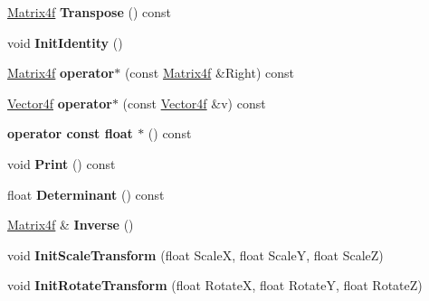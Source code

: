 \begin{DoxyCompactItemize}
\item 
\hypertarget{classMatrix4f_aaa55b11a3b44065ebaea23750d8f15f2}{\hyperlink{classMatrix4f}{Matrix4f} {\bfseries Transpose} () const }\label{classMatrix4f_aaa55b11a3b44065ebaea23750d8f15f2}

\item 
\hypertarget{classMatrix4f_a5cedfa71f928157c3ed4516edc72cb9c}{void {\bfseries Init\-Identity} ()}\label{classMatrix4f_a5cedfa71f928157c3ed4516edc72cb9c}

\item 
\hypertarget{classMatrix4f_adbda08a5bee8094658af28bfaa851e1c}{\hyperlink{classMatrix4f}{Matrix4f} {\bfseries operator$\ast$} (const \hyperlink{classMatrix4f}{Matrix4f} \&Right) const }\label{classMatrix4f_adbda08a5bee8094658af28bfaa851e1c}

\item 
\hypertarget{classMatrix4f_ae41adb262631b053ab76c68a36be4c4e}{\hyperlink{structVector4f}{Vector4f} {\bfseries operator$\ast$} (const \hyperlink{structVector4f}{Vector4f} \&v) const }\label{classMatrix4f_ae41adb262631b053ab76c68a36be4c4e}

\item 
\hypertarget{classMatrix4f_ab6bc3cb75cb930b2eed630dda75499d2}{{\bfseries operator const float $\ast$} () const }\label{classMatrix4f_ab6bc3cb75cb930b2eed630dda75499d2}

\item 
\hypertarget{classMatrix4f_a99eef2db139a6334b4d53b5876b364bf}{void {\bfseries Print} () const }\label{classMatrix4f_a99eef2db139a6334b4d53b5876b364bf}

\item 
\hypertarget{classMatrix4f_ab61077c954bd8bcc6f422b2ba9109685}{float {\bfseries Determinant} () const }\label{classMatrix4f_ab61077c954bd8bcc6f422b2ba9109685}

\item 
\hypertarget{classMatrix4f_a565187a44d253c52b86037855ef84106}{\hyperlink{classMatrix4f}{Matrix4f} \& {\bfseries Inverse} ()}\label{classMatrix4f_a565187a44d253c52b86037855ef84106}

\item 
\hypertarget{classMatrix4f_aa0552eaded648aa9c77ef72385e79ced}{void {\bfseries Init\-Scale\-Transform} (float Scale\-X, float Scale\-Y, float Scale\-Z)}\label{classMatrix4f_aa0552eaded648aa9c77ef72385e79ced}

\item 
\hypertarget{classMatrix4f_acaba507cb1366b75f353816c8f7c1f81}{void {\bfseries Init\-Rotate\-Transform} (float Rotate\-X, float Rotate\-Y, float Rotate\-Z)}\label{classMatrix4f_acaba507cb1366b75f353816c8f7c1f81}


\end{DoxyCompactItemize}
